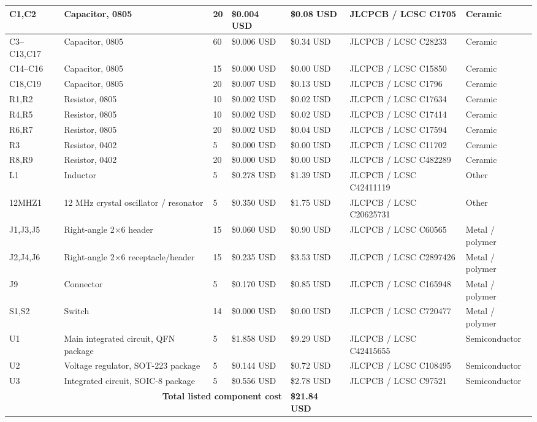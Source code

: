 \begin{table}[h]
\begin{tabular}{|p{2.2cm}|p{3.2cm}|p{1.2cm}|p{2.0cm}|p{2.0cm}|p{2.2cm}|p{1.8cm}|}
C1,C2 & Capacitor, 0805 & 20 & \$0.004 USD & \$0.08 USD & JLCPCB / LCSC C1705 & Ceramic \\\hline
C3--C13,C17 & Capacitor, 0805 & 60 & \$0.006 USD & \$0.34 USD & JLCPCB / LCSC C28233 & Ceramic \\\hline
C14--C16 & Capacitor, 0805 & 15 & \$0.000 USD & \$0.00 USD & JLCPCB / LCSC C15850 & Ceramic \\\hline
C18,C19 & Capacitor, 0805 & 20 & \$0.007 USD & \$0.13 USD & JLCPCB / LCSC C1796 & Ceramic \\\hline
R1,R2 & Resistor, 0805 & 10 & \$0.002 USD & \$0.02 USD & JLCPCB / LCSC C17634 & Ceramic \\\hline
R4,R5 & Resistor, 0805 & 10 & \$0.002 USD & \$0.02 USD & JLCPCB / LCSC C17414 & Ceramic \\\hline
R6,R7 & Resistor, 0805 & 20 & \$0.002 USD & \$0.04 USD & JLCPCB / LCSC C17594 & Ceramic \\\hline
R3 & Resistor, 0402 & 5 & \$0.000 USD & \$0.00 USD & JLCPCB / LCSC C11702 & Ceramic \\\hline
R8,R9 & Resistor, 0402 & 20 & \$0.000 USD & \$0.00 USD & JLCPCB / LCSC C482289 & Ceramic \\\hline
L1 & Inductor & 5 & \$0.278 USD & \$1.39 USD & JLCPCB / LCSC C42411119 & Other \\\hline
12MHZ1 & 12 MHz crystal oscillator / resonator & 5 & \$0.350 USD & \$1.75 USD & JLCPCB / LCSC C20625731 & Other \\\hline
J1,J3,J5 & Right-angle 2$\times$6 header & 15 & \$0.060 USD & \$0.90 USD & JLCPCB / LCSC C60565 & Metal / polymer \\\hline
J2,J4,J6 & Right-angle 2$\times$6 receptacle/header & 15 & \$0.235 USD & \$3.53 USD & JLCPCB / LCSC C2897426 & Metal / polymer \\\hline
J9 & Connector & 5 & \$0.170 USD & \$0.85 USD & JLCPCB / LCSC C165948 & Metal / polymer \\\hline
S1,S2 & Switch & 14 & \$0.000 USD & \$0.00 USD & JLCPCB / LCSC C720477 & Metal / polymer \\\hline
U1 & Main integrated circuit, QFN package & 5 & \$1.858 USD & \$9.29 USD & JLCPCB / LCSC C42415655 & Semiconductor \\\hline
U2 & Voltage regulator, SOT-223 package & 5 & \$0.144 USD & \$0.72 USD & JLCPCB / LCSC C108495 & Semiconductor \\\hline
U3 & Integrated circuit, SOIC-8 package & 5 & \$0.556 USD & \$2.78 USD & JLCPCB / LCSC C97521 & Semiconductor \\\hline

\multicolumn{4}{|r|}{\textbf{Total listed component cost}} & \textbf{\$21.84 USD} & \multicolumn{2}{l|}{} \\\hline
\end{tabular}
\end{table}

